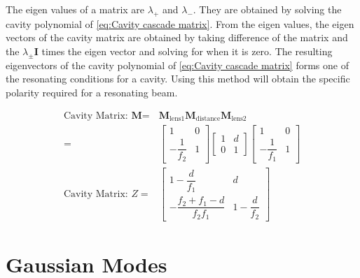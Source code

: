 \documentclass[11pt,a4paper]{book}
\begin{document}
		\noindent The eigen values of a matrix are $\lambda_+$ and $\lambda_-$. They are obtained by solving the cavity polynomial of \autoref{eq:Cavity cascade matrix}. From the eigen values, the eigen vectors of the cavity matrix are obtained by taking difference of the matrix and the $\lambda_{\pm} \textbf{I}$ times the eigen vector and solving for when it is zero. The resulting eigenvectors of the cavity polynomial of \autoref{eq:Cavity cascade matrix} forms one of the resonating conditions for a cavity. Using this method will obtain the specific polarity required for a resonating beam.
		
		\begin{equation}
		\label{eq:double lens cascade matrix}
		\begin{split}
		\text{Cavity Matrix: }  \textbf{M} = & \textbf{M}_{\text{lens1}}\textbf{M}_{\text{distance}} \textbf{M}_{\text{lens2}} \\
		= & \begin{bmatrix} 1 & 0 \\ -\dfrac{1}{f_2} & 1 \end{bmatrix} \begin{bmatrix} 1 & d \\ 0 & 1 \end{bmatrix} \begin{bmatrix} 1 & 0 \\ -\dfrac{1}{f_1} & 1 \end{bmatrix} \\ \text{Cavity Matrix: }  Z= & \begin{bmatrix} 1-\dfrac{d}{f_1} & d \\ -\dfrac{f_2+f_1-d}{f_2f_1} & 1-\dfrac{d}{f_2} \end{bmatrix}
		\end{split}
		\end{equation}
		
	\section{Gaussian Modes}
		\label{sec:Gaussian Modes}
		
		
\end{document}
